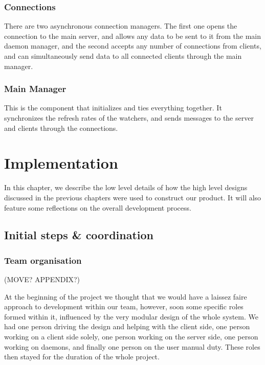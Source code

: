 \documentclass{l3proj}
\begin{document}
\subsection{Connections}
There are two asynchronous connection managers. The first one opens the connection to the main server, and allows any data to be sent to it from the main daemon manager, and the second accepts any number of connections from clients, and can simultaneously send data to all connected clients through the main manager.

\subsection{Main Manager}
This is the component that initializes and ties everything together. It synchronizes the refresh rates of the watchers, and sends messages to the server and clients through the connections.



\chapter{Implementation}
\label{impl}

In this chapter, we describe the low level details of how the high level designs discussed in the previous chapters were used to construct our product. It will also feature some reflections on the overall development process.


\section{Initial steps \& coordination}

\subsection{Team organisation}

(MOVE? APPENDIX?)

At the beginning of the project we thought that we would have a laissez faire approach to development within our team, however, soon some specific roles formed within it, influenced by the very modular design of the whole system. We had one person driving the design and helping with the client side, one person working on a client side solely, one person working on the server side, one person working on daemons, and finally one person on the user manual duty. These roles then stayed for the duration of the whole project.
\end{document}
